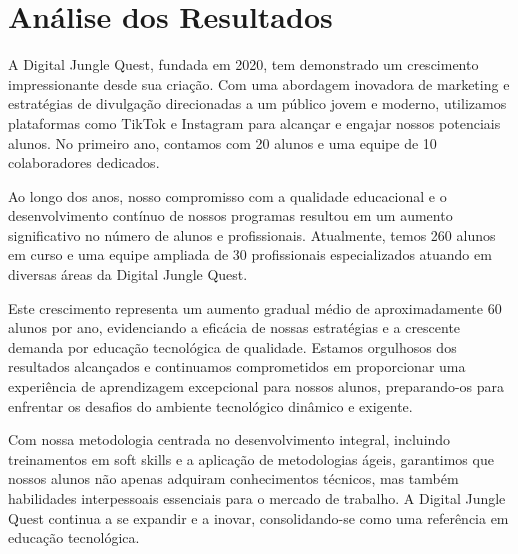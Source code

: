 \section{Análise dos Resultados}
\label{ch:resultados}
A Digital Jungle Quest, fundada em 2020, tem demonstrado um crescimento impressionante desde sua criação. Com uma abordagem inovadora de marketing e estratégias de divulgação direcionadas a um público jovem e moderno, utilizamos plataformas como TikTok e Instagram para alcançar e engajar nossos potenciais alunos. No primeiro ano, contamos com 20 alunos e uma equipe de 10 colaboradores dedicados.

Ao longo dos anos, nosso compromisso com a qualidade educacional e o desenvolvimento contínuo de nossos programas resultou em um aumento significativo no número de alunos e profissionais. Atualmente, temos 260 alunos em curso e uma equipe ampliada de 30 profissionais especializados atuando em diversas áreas da Digital Jungle Quest.

Este crescimento representa um aumento gradual médio de aproximadamente 60 alunos por ano, evidenciando a eficácia de nossas estratégias e a crescente demanda por educação tecnológica de qualidade. Estamos orgulhosos dos resultados alcançados e continuamos comprometidos em proporcionar uma experiência de aprendizagem excepcional para nossos alunos, preparando-os para enfrentar os desafios do ambiente tecnológico dinâmico e exigente.

Com nossa metodologia centrada no desenvolvimento integral, incluindo treinamentos em soft skills e a aplicação de metodologias ágeis, garantimos que nossos alunos não apenas adquiram conhecimentos técnicos, mas também habilidades interpessoais essenciais para o mercado de trabalho. A Digital Jungle Quest continua a se expandir e a inovar, consolidando-se como uma referência em educação tecnológica.


